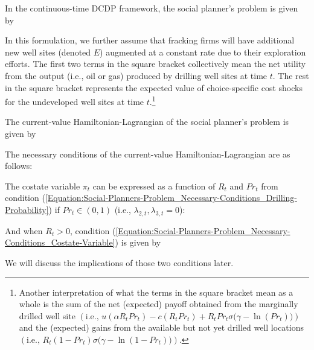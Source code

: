 In the continuous-time DCDP framework, the social planner's problem is given by

In this formulation, we further assume that fracking firms will have additional new well sites (denoted $E$) augmented at a constant rate due to their exploration efforts. The first two terms in the square bracket collectively mean the net utility from the output (i.e., oil or gas) produced by drilling well sites at time $t$. The rest in the square bracket represents the expected value of choice-specific cost shocks for the undeveloped well sites at time $t$.\footnote{Another interpretation of what the terms in the square bracket mean as a whole is the sum of the net (expected) payoff obtained from the marginally drilled well site $\left( \text{i.e., } u(\alpha R_{t} Pr_{t}) - c(R_{t} Pr_{t}) + R_{t} Pr_{t} \sigma \big( \gamma - \ln(Pr_{t}) \big) \right)$ and the (expected) gains from the available but not yet drilled well locations $\left( \text{i.e., } R_{t} (1 - Pr_{t}) \sigma \big( \gamma - \ln(1 - Pr_{t}) \big) \right)$.}

The current-value Hamiltonian-Lagrangian of the social planner's problem is given by


The necessary conditions of the current-value Hamiltonian-Lagrangian are as follows:


The costate variable $\pi_{t}$ can be expressed as a function of $R_{t}$ and $Pr_{t}$ from condition (\ref{Equation:Social-Planners-Problem_Necessary-Conditions_Drilling-Probability}) if $Pr_{t} \in (0,1)$ (i.e., $\lambda_{2,t}, \lambda_{3,t} = 0$):

And when $R_{t} > 0$, condition (\ref{Equation:Social-Planners-Problem_Necessary-Conditions_Costate-Variable}) is given by

We will discuss the implications of those two conditions later. 

